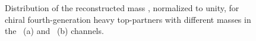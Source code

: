 \begin{figure}[!hbt]\begin{center}
	\caption{Distribution of the reconstructed mass \mreco, normalized to unity,
        for chiral fourth-generation heavy top-partners with different masses in the \loose\ (a)
        and \tight\ (b) channels.\label{fig:masses}}
\end{center}\end{figure}
